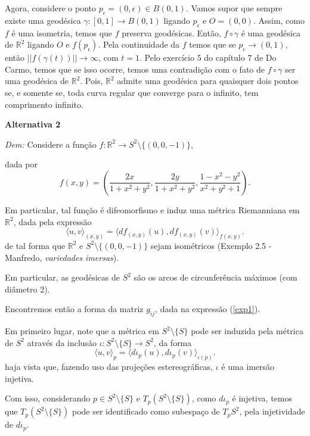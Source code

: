 \documentclass[twoside,openright,titlepage,numbers=noenddot,headinclude,  lineheaders footinclude=true,cleardoublepage=empty,BCOR=5mm,paper=a4,fontsize=12pt ]{scrbook}
\newcommand{\R}{\mathbb R}
\begin{document}
Agora,
considere o ponto $p_\epsilon = (0, \epsilon) \in B(0, 1)$.
Vamos supor que sempre existe uma geodésica $\gamma : [0, 1] \rightarrow B(0,1)$ ligando $p_\epsilon$ e $O = (0,0)$. 
Assim,
como $f$ é uma isometria,
temos que $f$ preserva geodésicas.
Então, $f \circ \gamma$ é uma geodésica de $\R^2$ ligando $O$ e $f(p_\epsilon)$.
Pela continuidade da $f$ temos que se $p_\epsilon \rightarrow (0, 1)$,
então $||f(\gamma(t))|| \rightarrow \infty$,
com $t = 1$.
Pelo exercício $5$ do capítulo $7$ de Do Carmo,
temos que se isso ocorre,
temos uma contradição com o fato de $f \circ \gamma$ ser uma geodésica de $\R^2$.
Pois,
$\R^2$ admite uma geodésica para quaisquer dois pontos se,
e somente se,
toda curva regular que converge para o infinito,
tem comprimento infinito.

\textbf{Alternativa 2}

\noindent\textit{Dem:} Considere a função $f: \R^2 \longrightarrow S^2 \setminus \{(0,0,-1)\}$,

dada por
\begin{equation*}
    f(x,y) = \left(\frac{2x}{1+x^2+y^2}, \frac{2y}{1+x^2+y^2}, \frac{1-x^2-y^2}{x^2+y^2+1}\right). 
\end{equation*}

Em particular, tal função é difeomorfismo e induz uma métrica Riemanniana em $\R^2$, dada pela expressão
\begin{equation}\label{exp1}
    \langle u,v\rangle_{(x,y)} = \langle df_{(x,y)}(u),df_{(x,y)}(v) \rangle_{f(x,y)}. 
\end{equation}
de tal forma que $\R^2$ e $S^2\setminus \{(0,0,-1)\}$ sejam isométricos (Exemplo 2.5 - Manfredo, \textit{variedades imersas}). 

Em particular, as geodésicas de $S^2$ são os arcos de circunferência máximos (com diâmetro 2). 

Encontremos então a forma da matriz $g_{ij}$, dada na expressão (\ref{exp1}). 

Em primeiro lugar, note que a métrica em $S^2 \setminus \{S\}$ pode ser induzida pela métrica  de $S^2$ através da inclusão $\iota: S^2 \setminus \{S\} \longrightarrow S^2$, da forma 
\begin{equation}\label{exp2}
    \langle u,v \rangle_p = \langle d \iota_p(u), d\iota_p(v)\rangle_{\iota(p)}. 
\end{equation}
haja vista que, fazendo uso das projeções estereográficas, $\iota$ é uma imersão injetiva. 

Com isso, considerando $p \in S^2 \setminus \{S\}$ e $T_p (S^2 \setminus \{S\})$, como $d\iota_p$ é injetiva, temos que $T_p (S^2\setminus \{S\})$ pode ser identificado como subespaço de $T_p S^2$, pela injetividade de $d\iota_p$. 
\end{document}
